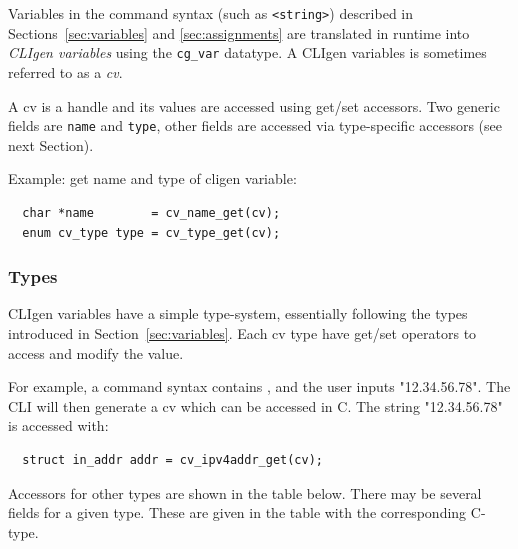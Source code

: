\documentclass[a4paper, 10pt] {article}
\begin{document}
Variables in the command syntax (such as {\tt <string>}) described in
Sections~\ref{sec:variables} and \ref{sec:assignments} are translated
in runtime into \emph{CLIgen variables} using the {\tt cg\_var}
datatype.  A CLIgen variables is sometimes referred to as a \emph{cv}.

A cv is a handle and its values are accessed using get/set
accessors. Two generic fields are {\tt name} and {\tt type}, other
fields are accessed via type-specific accessors (see next Section).

Example: get name and type of cligen variable:
\begin{verbatim}
  char *name        = cv_name_get(cv);
  enum cv_type type = cv_type_get(cv);
\end{verbatim}


\subsubsection{Types}

CLIgen variables have a simple type-system, essentially following the
types introduced in Section~\ref{sec:variables}. Each cv type
have get/set operators to access and modify the value.

For example, a command syntax contains {\tt <addr:ipv4addr>}, and
the user inputs "12.34.56.78". The CLI will then generate a cv which
can be accessed in C. The string
"12.34.56.78" is accessed with:
\begin{verbatim}
  struct in_addr addr = cv_ipv4addr_get(cv);
\end{verbatim}

Accessors for other types are shown in the table
below. There may be several fields for a given type. These are given
in the table with the corresponding C-type.
\end{document}
